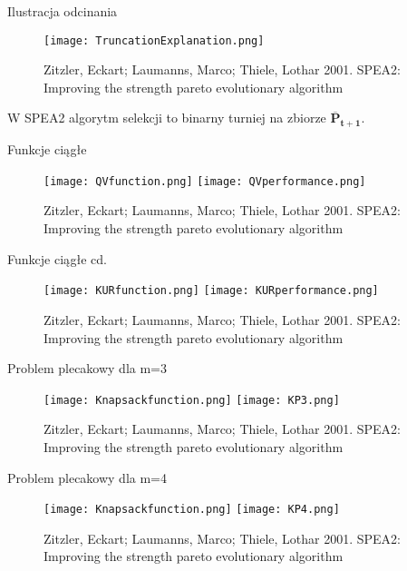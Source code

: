 \documentclass{beamer}
\begin{document}
\begin{frame}{Ilustracja odcinania}
    \begin{figure}[htp]
    \centering
    \texttt{[image: TruncationExplanation.png]}
    \caption{Zitzler, Eckart; Laumanns, Marco; Thiele, Lothar 2001. SPEA2: Improving the strength pareto evolutionary algorithm}
\end{figure}
W SPEA2 algorytm selekcji to binarny turniej na zbiorze $\boldsymbol{\overline{P}_{t+1}}$.
\end{frame}


\begin{frame}{Funkcje ciągłe}
\begin{figure}[htp]
    \centering
    \texttt{[image: QVfunction.png]}
    \texttt{[image: QVperformance.png]}
    \caption{Zitzler, Eckart; Laumanns, Marco; Thiele, Lothar 2001. SPEA2: Improving the strength pareto evolutionary algorithm}
\end{figure}
\end{frame}


\begin{frame}{Funkcje ciągłe cd.}
\begin{figure}[htp]
    \centering
    \texttt{[image: KURfunction.png]}
    \texttt{[image: KURperformance.png]}
    \caption{Zitzler, Eckart; Laumanns, Marco; Thiele, Lothar 2001. SPEA2: Improving the strength pareto evolutionary algorithm}
\end{figure}
\end{frame}


\begin{frame}{Problem plecakowy dla m=3}
\begin{figure}[htp]
    \centering
    \texttt{[image: Knapsackfunction.png]}
    \texttt{[image: KP3.png]}
    \caption{Zitzler, Eckart; Laumanns, Marco; Thiele, Lothar 2001. SPEA2: Improving the strength pareto evolutionary algorithm}
\end{figure}
\end{frame}


\begin{frame}{Problem plecakowy dla m=4}
\begin{figure}[htp]
    \centering
    \texttt{[image: Knapsackfunction.png]}
    \texttt{[image: KP4.png]}
    \caption{Zitzler, Eckart; Laumanns, Marco; Thiele, Lothar 2001. SPEA2: Improving the strength pareto evolutionary algorithm}
\end{figure}
\end{frame}
\end{document}
